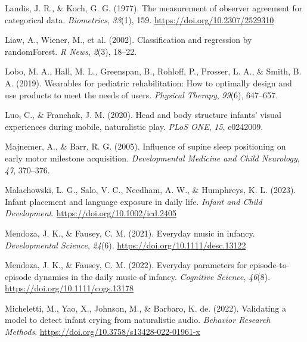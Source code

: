 \documentclass[
  man]{apa6}
\newlength{\cslhangindent}
\newlength{\cslentryspacingunit} %
\newenvironment{CSLReferences}[2] %
 {%
  \setlength{\parindent}{0pt}
  \ifodd #1
  \let\oldpar\par
  \def\par{\hangindent=\cslhangindent\oldpar}
  \fi
  \setlength{\parskip}{#2\cslentryspacingunit}
 }%
 {}
\begin{document}
\begin{CSLReferences}{1}{0}
\leavevmode{}%
Landis, J. R., \& Koch, G. G. (1977). The measurement of observer agreement for categorical data. \emph{Biometrics}, \emph{33}(1), 159. \url{https://doi.org/10.2307/2529310}

\leavevmode{}%
Liaw, A., Wiener, M., et al. (2002). Classification and regression by randomForest. \emph{R News}, \emph{2}(3), 18--22.

\leavevmode{}%
Lobo, M. A., Hall, M. L., Greenspan, B., Rohloff, P., Prosser, L. A., \& Smith, B. A. (2019). Wearables for pediatric rehabilitation: How to optimally design and use products to meet the needs of users. \emph{Physical Therapy}, \emph{99}(6), 647--657.

\leavevmode{}%
Luo, C., \& Franchak, J. M. (2020). Head and body structure infants' visual experiences during mobile, naturalistic play. \emph{{PLoS ONE}}, \emph{15}, e0242009.

\leavevmode{}%
Majnemer, A., \& Barr, R. G. (2005). Influence of supine sleep positioning on early motor milestone acquisition. \emph{Developmental Medicine and Child Neurology}, \emph{47}, 370--376.

\leavevmode{}%
Malachowski, L. G., Salo, V. C., Needham, A. W., \& Humphreys, K. L. (2023). Infant placement and language exposure in daily life. \emph{Infant and Child Development}. \url{https://doi.org/10.1002/icd.2405}

\leavevmode{}%
Mendoza, J. K., \& Fausey, C. M. (2021). Everyday music in infancy. \emph{Developmental Science}, \emph{24}(6). \url{https://doi.org/10.1111/desc.13122}

\leavevmode{}%
Mendoza, J. K., \& Fausey, C. M. (2022). Everyday parameters for episode-to-episode dynamics in the daily music of infancy. \emph{Cognitive Science}, \emph{46}(8). \url{https://doi.org/10.1111/cogs.13178}

\leavevmode{}%
Micheletti, M., Yao, X., Johnson, M., \& Barbaro, K. de. (2022). Validating a model to detect infant crying from naturalistic audio. \emph{Behavior Research Methods}. \url{https://doi.org/10.3758/s13428-022-01961-x}


\end{CSLReferences}
\end{document}
